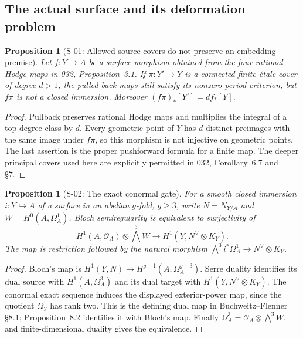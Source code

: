 \documentclass[11pt,a4paper]{article}
\newtheorem{proposition}[theorem]{Proposition}
\theoremstyle{definition}
\begin{document}

\subsection{The actual surface and its deformation problem}

\begin{proposition}[S-01: Allowed source covers do not preserve an embedding premise]
\label{prop:semireg-cover-domain}
Let $f:Y\to A$ be a surface morphism obtained from the four rational
Hodge maps in 032, Proposition~3.1. If $\pi:Y'\to Y$ is a connected finite
\'etale cover of degree $d>1$, the pulled-back maps still satisfy its
nonzero-period criterion, but $f\pi$ is not a closed immersion.
Moreover $(f\pi)_*[Y']=d f_*[Y]$.
\end{proposition}
\begin{proof}
Pullback preserves rational Hodge maps and multiplies the integral of
a top-degree class by $d$. Every geometric point of $Y$ has $d$ distinct
preimages with the same image under $f\pi$, so this morphism is not
injective on geometric points. The last assertion is the proper
pushforward formula for a finite map. The deeper principal covers
used here are explicitly permitted in 032, Corollary~6.7 and \S7.
\end{proof}

\begin{proposition}[S-02: The exact conormal gate]
\label{prop:semireg-dual-gate}
For a smooth closed immersion $i:Y\hookrightarrow A$ of a surface in
an abelian $g$-fold, $g\geq3$, write $N=N_{Y/A}$ and
$W=H^0(A,\Omega_A^1)$. Bloch semiregularity is equivalent to
surjectivity of
\[
 H^1(A,\mathcal O_A)\otimes\bigwedge^3W
 \longrightarrow H^1(Y,N^\vee\otimes K_Y).
\]
The map is restriction followed by the natural morphism
$\bigwedge^3 i^*\Omega_A^1\to N^\vee\otimes K_Y$.
\end{proposition}
\begin{proof}
Bloch's map is
$H^1(Y,N)\to H^{g-1}(A,\Omega_A^{g-3})$.
Serre duality identifies its dual source with $H^1(A,\Omega_A^3)$
and its dual target with $H^1(Y,N^\vee\otimes K_Y)$.
The conormal exact sequence induces the displayed exterior-power
map, since the quotient $\Omega_Y^1$ has rank two.
This is the defining dual map in Buchweitz--Flenner \S8.1;
Proposition~8.2 identifies it with Bloch's map.
Finally $\Omega_A^3=\mathcal O_A\otimes\bigwedge^3W$,
and finite-dimensional duality gives the equivalence.
\end{proof}
\end{document}
